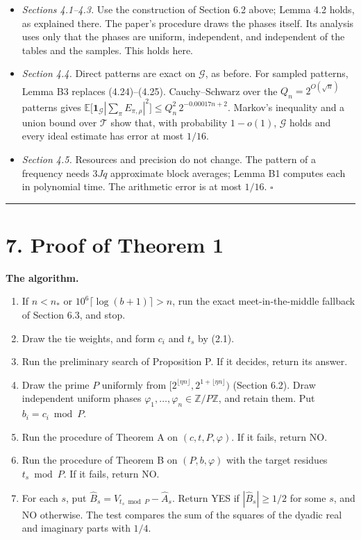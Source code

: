 \documentclass[10pt,a4paper]{article}
\begin{document}
\begin{itemize}
\item \emph{Sections 4.1--4.3.} Use the construction of Section 6.2 above; Lemma 4.2 holds, as explained there. The paper's
procedure draws the phases itself. Its analysis uses only that the phases are uniform, independent, and independent
of the tables and the samples. This holds here.
\item \emph{Section 4.4.} Direct patterns are exact on $\mathcal G$, as before. For sampled patterns, Lemma B3 replaces
(4.24)--(4.25). Cauchy--Schwarz over the $Q_n = 2^{O(\sqrt n)}$ patterns gives
$\mathbb E\big[\mathbf 1_{\mathcal G}|\sum_\pi E_{\pi,\rho}|^2\big] \le Q_n^2\,2^{-0.00017n + 2}$. Markov's inequality and a
union bound over $\mathcal T$ show that, with probability $1 - o(1)$, $\mathcal G$ holds and every ideal estimate has
error at most $1/16$.
\item \emph{Section 4.5.} Resources and precision do not change. The pattern of a frequency needs $3Jq$ approximate block
averages; Lemma B1 computes each in polynomial time. The arithmetic error is at most $1/16$. $\square$
\end{itemize}

\medskip\noindent\rule{\linewidth}{0.4pt}\medskip

\section*{7. Proof of Theorem 1}

\textbf{The algorithm.}

\begin{enumerate}
\item If $n < n_*$ or $10^6\lceil\log(b+1)\rceil > n$, run the exact meet-in-the-middle fallback of Section 6.3, and stop.
\item Draw the tie weights, and form $c_i$ and $t_s$ by (2.1).
\item Run the preliminary search of Proposition P. If it decides, return its answer.
\item Draw the prime $P$ uniformly from $[2^{\lfloor\eta n\rfloor}, 2^{1+\lfloor\eta n\rfloor})$ (Section 6.2). Draw independent
uniform phases $\varphi_1, \dots, \varphi_n \in \mathbb Z/P\mathbb Z$, and retain them. Put $b_i = c_i \bmod P$.
\item Run the procedure of Theorem A on $(c, t, P, \varphi)$. If it fails, return NO.
\item Run the procedure of Theorem B on $(P, b, \varphi)$ with the target residues $t_s \bmod P$. If it fails, return NO.
\item For each $s$, put $\hat B_s = \hat V_{t_s\bmod P} - \hat A_s$. Return YES if $|\hat B_s| \ge 1/2$ for some $s$, and NO
otherwise. The test compares the sum of the squares of the dyadic real and imaginary parts with $1/4$.
\end{enumerate}
\end{document}
